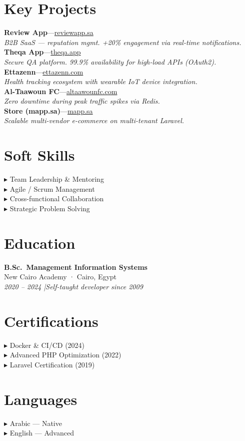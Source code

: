 \documentclass[10pt, a4paper]{article}
\newcommand{\proj}[4]{%
  {\small\bfseries\color{Dark}#1}\enspace---\enspace\href{#3}{\small\color{Blue}#2}\\[1pt]%
  {\footnotesize\color{Light}\textit{#4}}\\[6pt]%
}
\begin{document}
\begin{paracol}{2}
\section{Key Projects}

\proj{Review App}{reviewapp.sa}{https://reviewapp.sa/}{B2B SaaS — reputation mgmt. +20\% engagement via real-time notifications.}
\proj{Theqa App}{theqa.app}{https://theqa.app/}{Secure QA platform. 99.9\% availability for high-load APIs (OAuth2).}
\proj{Ettazenn}{ettazenn.com}{https://ettazenn.com/}{Health tracking ecosystem with wearable IoT device integration.}
\proj{Al-Taawoun FC}{altaawounfc.com}{https://altaawounfc.com/}{Zero downtime during peak traffic spikes via Redis.}
\proj{Store (mapp.sa)}{mapp.sa}{https://mapp.sa/}{Scalable multi-vendor e-commerce on multi-tenant Laravel.}

\section{Soft Skills}

{\small\color{Mid}
▸ Team Leadership \& Mentoring\\[3pt]
▸ Agile / Scrum Management\\[3pt]
▸ Cross-functional Collaboration\\[3pt]
▸ Strategic Problem Solving%
}

\section{Education}

{\small\bfseries\color{Dark}B.Sc.\ Management Information Systems}\\
{\small\color{Mid}New Cairo Academy · Cairo, Egypt}\\
{\small\itshape\color{Light}2020 – 2024 \enspace|\enspace Self-taught developer since 2009}

\section{Certifications}

{\small\color{Mid}
▸ Docker \& CI/CD (2024)\\[3pt]
▸ Advanced PHP Optimization (2022)\\[3pt]
▸ Laravel Certification (2019)%
}

\section{Languages}

{\small\color{Mid}
▸ Arabic — Native\\[3pt]
▸ English — Advanced%
}

\end{paracol}
\end{document}
